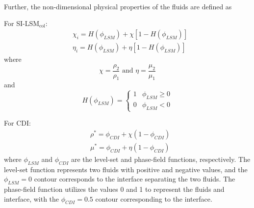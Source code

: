 \documentclass[a4paper,fleqn]{cas-sc}
\begin{document}
	Further, the non-dimensional physical properties of the fluids are defined as
	
	\noindent For SI-LSM$_{\text{col}}$:  
	\begin{equation*}
		\begin{aligned}
			&\chi_{i}=H(\phi_{LSM}) + \chi \left[1-H(\phi_{LSM})\right]\\
			&\eta_{i}=H(\phi_{LSM}) + \eta \left[1-H(\phi_{LSM})\right]
		\end{aligned}
	\end{equation*}
	where
	\begin{equation*}
		\chi=\frac{\rho_2}{\rho_1}\text{ and }\eta=\frac{\mu_2}{\mu_1}
	\end{equation*}
	and
	\begin{equation*}
		H(\phi_{LSM})=\begin{cases}
			1&\phi_{LSM}\ge0\\
			0&\phi_{LSM}< 0
		\end{cases}
	\end{equation*}
	
	\noindent For CDI:
	\begin{equation*}
		\begin{aligned}
			&\rho^{*}=\phi_{CDI} + \chi \left(1-\phi_{CDI}\right)\\
			&\mu^{*}=\phi_{CDI} + \eta \left(1-\phi_{CDI}\right)
		\end{aligned}
	\end{equation*}
	where $\phi_{LSM}$ and $\phi_{CDI}$ are the level-set and phase-field functions, respectively. The level-set function represents two fluids with positive and negative values, and the $\phi_{LSM}=0$ contour corresponds to the interface separating the two fluids. The phase-field function utilizes the values 0 and 1 to represent the fluids and interface, with the $\phi_{CDI}=0.5$ contour corresponding to the interface.
	
\end{document}
